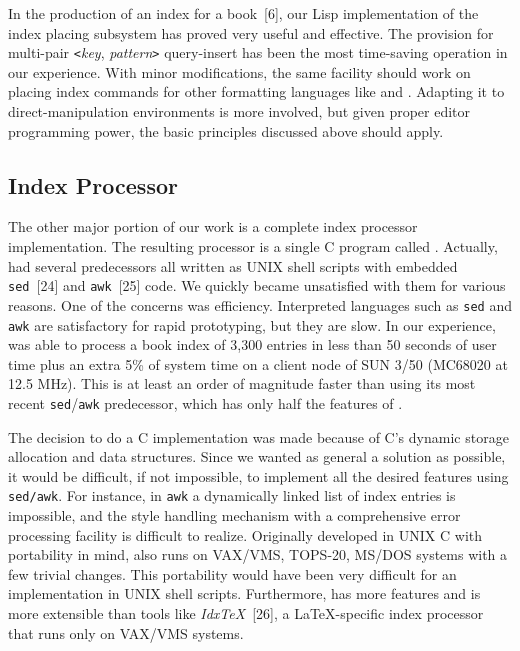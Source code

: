 In the production of an index for a book~[6], our {\E} Lisp
implementation of the index placing subsystem has proved very useful
and effective.  The provision for multi-pair
\verb|<|{\it key\/}, {\it pattern\/}\verb|>| query-insert has been the most
time-saving operation in our experience.
With minor modifications, the same facility should work on
placing index commands for other formatting languages like
{\TF} and {\SB}.  Adapting it to direct-manipulation environments is more
involved, but given proper editor programming power,
the basic principles discussed above should apply.

\subsection{Index Processor}
The other major portion of our work is
a complete index processor implementation.
The resulting processor
is a single C program called {\MI}.  Actually, {\MI}
had several predecessors all written as UNIX shell scripts with
embedded \verb|sed|~[24] and \verb|awk|~[25] code.
We quickly became unsatisfied with them for various reasons.
One of the concerns was efficiency.
Interpreted languages such as \verb|sed| and \verb|awk| are satisfactory for
rapid prototyping, but they are slow.
In our experience, {\MI} was able to process
a book index of 3,300 entries in less
than 50 seconds of user time plus an extra 5\% of system time on
a client node of SUN 3/50 (MC68020 at 12.5 MHz).
This is at least an order of magnitude faster than
using its most recent \verb|sed|/\verb|awk| predecessor, which has only
half the features of {\MI}.


The decision to do a C implementation was made because of C's dynamic
storage allocation and data structures.
Since we wanted as general a solution as possible, it would be difficult,
if not impossible, to implement all the desired features using \verb|sed/awk|.
For instance, in \verb|awk| a dynamically linked list of index entries is
impossible, and the style handling mechanism with a comprehensive error
processing facility is difficult to realize.  Originally developed
in UNIX C with portability in mind, {\MI} also runs on VAX/VMS,
TOPS-20, MS/DOS systems with a few trivial changes.
This portability would have
been very difficult for an implementation in UNIX shell scripts.
Furthermore, {\MI} has more features and is more extensible than tools like
{\sl Idx{\TeX}\/}~[26], a {\LaTeX}-specific index processor
that runs only on VAX/VMS systems.

